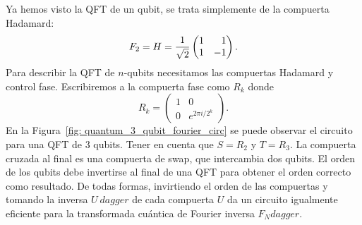 Ya hemos visto la QFT de un qubit, se trata simplemente de la compuerta Hadamard:
\begin{equation}
  F_2 = H = \hgate.
\end{equation}
Para describir la QFT de $n$-qubits necesitamos las compuertas Hadamard y control fase.
Escribiremos a la compuerta fase como $R_k$ donde
\begin{equation}
  R_k = \begin{pmatrix}
    1 & 0 \\
    0 & e^{2\pi i/2^k}
  \end{pmatrix}.
\end{equation}
En la Figura~\ref{fig: quantum_3_qubit_fourier_circ} se puede observar el circuito para una QFT de 3 qubits. Tener en cuenta que $ S = R_2 $ y $ T = R_3 $. La compuerta cruzada al final es una compuerta de swap, que intercambia dos qubits. El orden de los qubits debe invertirse al final de una QFT para obtener el orden correcto como resultado. De todas formas, invirtiendo el orden de las compuertas y tomando la inversa $ U ^ \ dagger $ de cada compuerta $ U $ da un circuito igualmente eficiente para la transformada cuántica de Fourier inversa $ F_N ^ \ dagger $.

